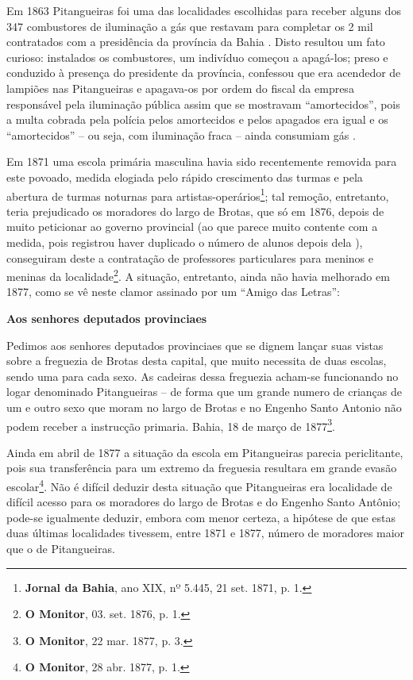Em 1863 Pitangueiras foi uma das localidades escolhidas para receber alguns dos 347 combustores de iluminação a gás que restavam para completar os 2 mil contratados com a presidência da província da Bahia \cite[p.~52]{bahia_rpe_1863}. Disto resultou um fato curioso: instalados os combustores, um indivíduo começou a apagá-los; preso e conduzido à presença do presidente da província, confessou que era acendedor de lampiões nas Pitangueiras e apagava-os por ordem do fiscal da empresa responsável pela iluminação pública assim que se mostravam ``amortecidos'', pois a multa cobrada pela polícia pelos amortecidos e pelos apagados era igual e os ``amortecidos'' -- ou seja, com iluminação fraca -- ainda consumiam gás \cite[relat.~chefe~polícia,~p.~25]{bahia_rpe_1870}. 

Em 1871 uma escola primária masculina havia sido recentemente removida para este povoado, medida elogiada pelo rápido crescimento das turmas e pela abertura de turmas noturnas para artistas-operários\footnote{\textbf{Jornal da Bahia}, ano XIX, nº 5.445, 21 set. 1871, p. 1.}; tal remoção, entretanto, teria prejudicado os moradores do largo de Brotas, que só em 1876, depois de muito peticionar ao governo provincial (ao que parece muito contente com a medida, pois registrou haver duplicado o número de alunos depois dela \cite[relat.~instrução~pública,~p.~25]{bahia_1872}), conseguiram deste a contratação de professores particulares para meninos e meninas da localidade\footnote{\textbf{O Monitor}, 03. set. 1876, p. 1.}. A situação, entretanto, ainda não havia melhorado em 1877, como se vê neste clamor assinado por um ``Amigo das Letras'':

\begin{citacao}
\textbf{Aos senhores deputados provinciaes}

Pedimos aos senhores deputados provinciaes que se dignem lançar suas vistas sobre a freguezia de Brotas desta capital, que muito necessita de duas escolas, sendo uma para cada sexo. As cadeiras dessa freguezia acham-se funcionando no logar denominado Pitangueiras -- de forma que um grande numero de crianças de um e outro sexo que moram no largo de Brotas e no Engenho Santo Antonio não podem receber a instrucção primaria.
Bahia, 18 de março de 1877\footnote{\textbf{O Monitor}, 22 mar. 1877, p. 3.}.
\end{citacao}

Ainda em abril de 1877 a situação da escola em Pitangueiras parecia periclitante, pois sua transferência para um extremo da freguesia resultara em grande evasão escolar\footnote{\textbf{O Monitor}, 28 abr. 1877, p. 1.}. Não é difícil deduzir desta situação que Pitangueiras era localidade de difícil acesso para os moradores do largo de Brotas e do Engenho Santo Antônio; pode-se igualmente deduzir, embora com menor certeza, a hipótese de que estas duas últimas localidades tivessem, entre 1871 e 1877, número de moradores maior que o de Pitangueiras. 


